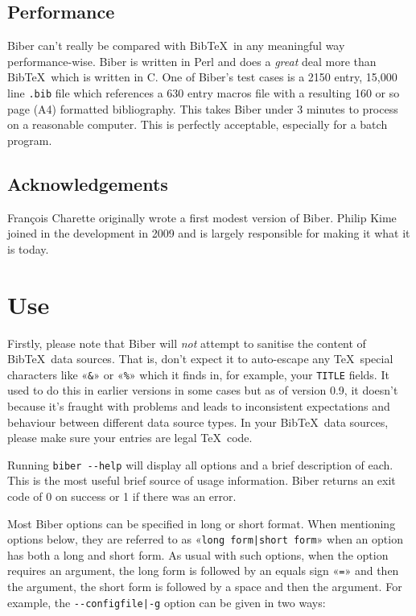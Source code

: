 \documentclass{ltxdockit}
\begin{document}
\subsection{Performance}

Biber can't really be compared with Bib\TeX\ in any meaningful
way performance-wise. Biber is written in Perl and does a
\emph{great} deal more than Bib\TeX\ which is written in C. One of
Biber's test cases is a 2150 entry, 15,000 line \verb+.bib+ file
which references a 630 entry macros file with a resulting 160 or so page (A4)
formatted bibliography. This takes Biber under 3 minutes to process on
a reasonable computer. This is perfectly acceptable, especially for a
batch program.

\subsection{Acknowledgements}

François Charette originally wrote a first modest version of Biber. Philip Kime joined in
the development in 2009 and is largely responsible for making it what it is today. 

\section{Use}

Firstly, please note that Biber will \emph{not} attempt to sanitise
the content of Bib\TeX\ data sources. That is, don't expect it to
auto-escape any \TeX\ special characters like «\verb+&+» or «\verb+%+» which
it finds in, for example, your \verb+TITLE+ fields. It used to do this in
earlier versions in some cases but as of version 0.9, it doesn't because
it's fraught with problems and leads to inconsistent expectations and
behaviour between different data source types. In your Bib\TeX\ data
sources, please make sure your entries are legal \TeX\ code.

Running \verb+biber --help+ will display all options and a brief
description of each. This is the most useful brief source of usage
information. Biber returns an exit code of 0 on success or 1 if
there was an error.

Most Biber options can be specified in long or short format. When
mentioning options below, they are referred to as
«\verb+long form|short form+» when an option has both a long and short
form. As usual with such options, when the option requires an argument, the
long form is followed by an equals sign «\verb+=+» and then the argument,
the short form is followed by a space and then the argument. For example,
the \verb+--configfile|-g+ option can be given in two ways:
\end{document}
